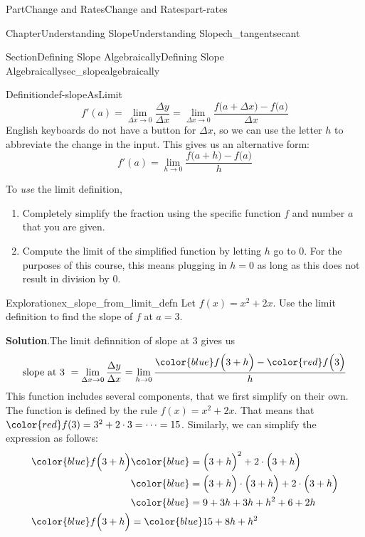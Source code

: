 \documentclass{tufte-book}
\newcommand{\blocktitlefont}{\relax}
\numberwithin{equation}{chapter}
\newcommand{\amp}{&}
\begin{document}
\begin{partptx}{Part}{Change and Rates}{}{Change and Rates}{}{}{part-rates}
\begin{chapterptx}{Chapter}{Understanding Slope}{}{Understanding Slope}{}{}{ch_tangentsecant}
\begin{sectionptx}{Section}{Defining Slope Algebraically}{}{Defining Slope Algebraically}{}{}{sec_slopealgebraically}
\begin{definition}{Definition}{}{def-slopeAsLimit}
\begin{equation*}
f'(a) = \lim_{\Delta x\rightarrow 0}\dfrac{\Delta y}{\Delta x} = \lim_{\Delta x\rightarrow 0} \dfrac{ f\Big(a+\Delta x\Big) - f\Big(a\Big) }{\Delta x} 
\end{equation*}
English keyboards do not have a button for \(\Delta x\), so we can use the letter \(h\) to abbreviate the change in the input.  This gives us an alternative form:%
\begin{equation*}
f'(a) = \displaystyle \lim_{h\rightarrow 0}\dfrac{f\Big(a+h\Big) - f\Big(a\Big) }{h} 
\end{equation*}
%
\end{definition}
To \emph{use} the limit definition,%
\begin{enumerate}
\item{}Completely simplify the fraction using the specific function \(f\) and number \(a\) that you are given.%
\item{}Compute the limit of the simplified function by letting \(h\) go to \(0\). For the purposes of this course, this means plugging in \(h=0\) as long as this does not result in division by \(0\).%
\end{enumerate}
%
\begin{exploration}{Exploration}{}{ex_slope_from_limit_defn}%
Let \(f(x) = x^2 + 2x\). Use the limit definition to find the slope of \(f\) at \(a=3\).%
\par\smallskip%
\noindent\textbf{\blocktitlefont Solution}.\hypertarget{ex_slope_from_limit_defn-2}{}\quad{}The limit definnition of slope at \(3\) gives us%
\begin{equation*}
\text{slope at 3 } = \lim_{\Delta x\rightarrow 0} \dfrac{\Delta y}{\Delta x} = \lim_{h\rightarrow 0} \dfrac{ {\color{blue}f\Big(3+h\Big)} - {\color{red} f\Big(3\Big)}}{h}
\end{equation*}
This function includes several components, that we first simplify on their own. The function is defined by the rule  \(f(x) = x^2 + 2x\).  That means that \(\color{red} f(3) = 3^2 + 2\cdot 3 = \dots = 15\). Similarly, we can simplify the expression as follows:%
\begin{align*}
\color{blue} f\Big(3+h\Big) \amp \color{blue} = \Big(3+h\Big)^2 + 2\cdot \Big(3+h\Big) \\
\amp \color{blue} = \Big(3+h\Big)\cdot\Big(3+h\Big)  + 2\cdot \Big(3+h\Big) \\
\amp \color{blue} = 9 + 3h + 3h + h^2 + 6 + 2h  \\
\color{blue} f\Big(3+h\Big) \amp = \color{blue} 15 + 8h + h^2   

\end{align*}
\end{exploration}
\end{sectionptx}
\end{chapterptx}
\end{partptx}
\end{document}
